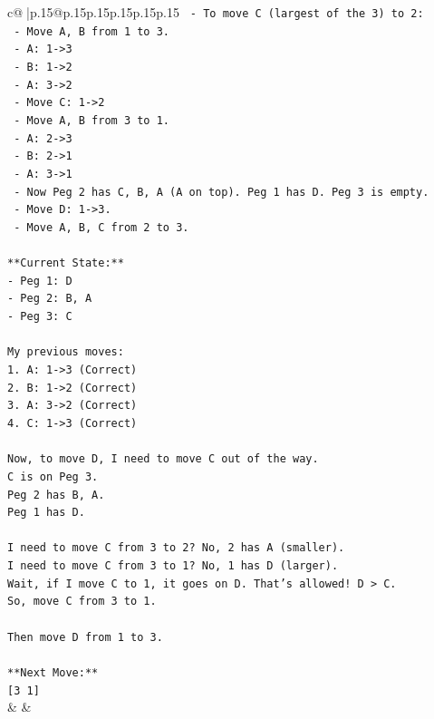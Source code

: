 \documentclass{article}
\begin{document}
{\begin{supertabular}{c@{$\;$}|p{.15\linewidth}@{}p{.15\linewidth}p{.15\linewidth}p{.15\linewidth}p{.15\linewidth}p{.15\linewidth}}
{{{\texttt{   {-} To move C (largest of the 3) to 2:} \\
\texttt{     {-} Move A, B from 1 to 3.} \\
\texttt{       {-} A: 1{-}>3} \\
\texttt{       {-} B: 1{-}>2} \\
\texttt{       {-} A: 3{-}>2} \\
\texttt{     {-} Move C: 1{-}>2} \\
\texttt{     {-} Move A, B from 3 to 1.} \\
\texttt{       {-} A: 2{-}>3} \\
\texttt{       {-} B: 2{-}>1} \\
\texttt{       {-} A: 3{-}>1} \\
\texttt{   {-} Now Peg 2 has C, B, A (A on top). Peg 1 has D. Peg 3 is empty.} \\
\texttt{   {-} Move D: 1{-}>3.} \\
\texttt{   {-} Move A, B, C from 2 to 3.} \\
\\ 
\texttt{**Current State:**} \\
\texttt{{-} Peg 1: D} \\
\texttt{{-} Peg 2: B, A} \\
\texttt{{-} Peg 3: C} \\
\\ 
\texttt{My previous moves:} \\
\texttt{1. A: 1{-}>3 (Correct)} \\
\texttt{2. B: 1{-}>2 (Correct)} \\
\texttt{3. A: 3{-}>2 (Correct)} \\
\texttt{4. C: 1{-}>3 (Correct)} \\
\\ 
\texttt{Now, to move D, I need to move C out of the way.} \\
\texttt{C is on Peg 3.} \\
\texttt{Peg 2 has B, A.} \\
\texttt{Peg 1 has D.} \\
\\ 
\texttt{I need to move C from 3 to 2? No, 2 has A (smaller).} \\
\texttt{I need to move C from 3 to 1? No, 1 has D (larger).} \\
\texttt{Wait, if I move C to 1, it goes on D. That's allowed! D > C.} \\
\texttt{So, move C from 3 to 1.} \\
\\ 
\texttt{Then move D from 1 to 3.} \\
\\ 
\texttt{**Next Move:**} \\
\texttt{{[}3 1{]}} \\
            }
        }
    }
    & & \\ \\


\end{supertabular}}
\end{document}
